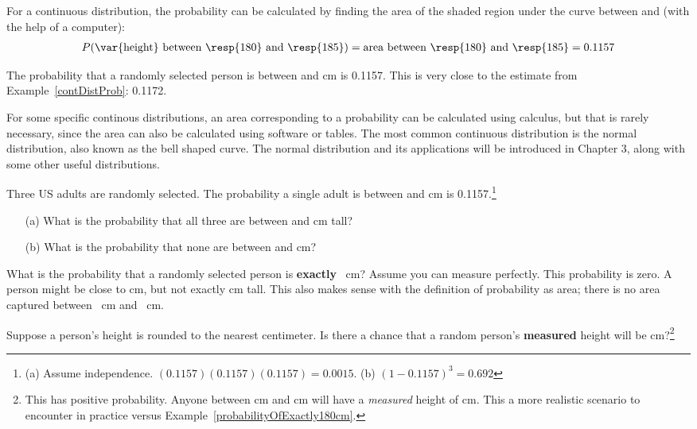 For a continuous distribution, the probability can be calculated by finding the area of the shaded region under the curve between  and  (with the help of a computer):
\begin{align*}
P(\text{\var{height} between \resp{180} and \resp{185}})
	= \text{area between \resp{180} and \resp{185}}
	= 0.1157
\end{align*}

The probability that a randomly selected person is between  and  cm is 0.1157. This is very close to the estimate from Example~\ref{contDistProb}: 0.1172. 

For some specific continous distributions, an area corresponding to a probability can be calculated using calculus, but that is rarely necessary, since the area can also be calculated using software or tables.  The most common continuous distribution is the normal distribution, also known as the bell shaped curve.  The normal distribution and its applications will be introduced in Chapter 3, along with some other useful distributions.

\begin{exercise}
Three US adults are randomly selected. The probability a single adult is between  and  cm is 0.1157.\footnote{(a) Assume independence. $(0.1157)  (0.1157) (0.1157) = 0.0015$. (b) $(1-0.1157)^3 = 0.692$} \vspace{-1.5mm}
\begin{enumerate}
\setlength{\itemsep}{0mm}
\item[(a)] What is the probability that all three are between  and  cm tall?
\item[(b)] What is the probability that none are between  and  cm?
\end{enumerate}
\end{exercise}

\begin{example}{What is the probability that a randomly selected person is \textbf{exactly} ~cm? Assume you can measure perfectly.}
\label{probabilityOfExactly180cm}
This probability is zero. A person might be close to  cm, but not exactly  cm tall. This also makes sense with the definition of probability as area; there is no area captured between ~cm and ~cm.
\end{example}

\begin{exercise}
Suppose a person's height is rounded to the nearest centimeter. Is there a chance that a random person's \textbf{measured} height will be  cm?\footnote{This has positive probability. Anyone between  cm and  cm will have a \emph{measured} height of  cm. This a more realistic scenario to encounter in practice versus Example~\ref{probabilityOfExactly180cm}.}
\end{exercise}


